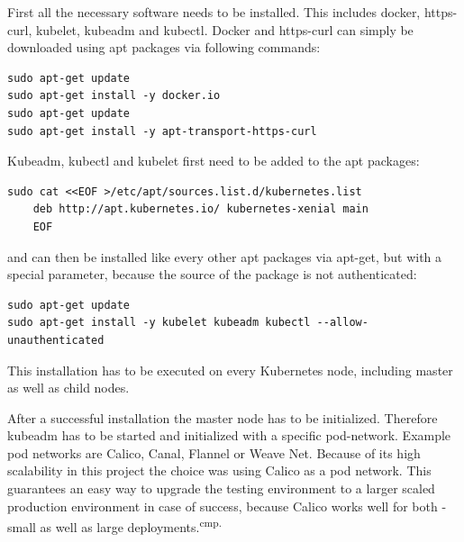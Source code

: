 First all the necessary software needs to be installed. This includes docker, https-curl, kubelet, kubeadm and kubectl. Docker and https-curl can simply be downloaded using apt packages via following commands:
\begin{lstlisting}[caption={Kubernetes requirements installation},captionpos=b]
sudo apt-get update
sudo apt-get install -y docker.io
sudo apt-get update
sudo apt-get install -y apt-transport-https-curl
\end{lstlisting}
Kubeadm, kubectl and kubelet first need to be added to the apt packages:
\begin{lstlisting}[caption={Add Kubernetes package to apt},captionpos=b]
sudo cat <<EOF >/etc/apt/sources.list.d/kubernetes.list
	deb http://apt.kubernetes.io/ kubernetes-xenial main
	EOF
\end{lstlisting}
and can then be installed like every other apt packages via apt-get, but with a special parameter, because the source of the package is not authenticated:
\begin{lstlisting}[caption={Install Kubernetes},captionpos=b]
sudo apt-get update
sudo apt-get install -y kubelet kubeadm kubectl --allow-unauthenticated
\end{lstlisting}
This installation has to be executed on every Kubernetes node, including master as well as child nodes.

After a successful installation the master node has to be initialized. Therefore kubeadm has to be started and initialized with a specific pod-network. Example pod networks are Calico, Canal, Flannel or Weave Net. Because of its high scalability in this project the choice was using Calico as a pod network. This guarantees an easy way to upgrade the testing environment to a larger scaled production environment in case of success, because Calico works well for both - small as well as large deployments.\textsuperscript{cmp.\cite{31}}


